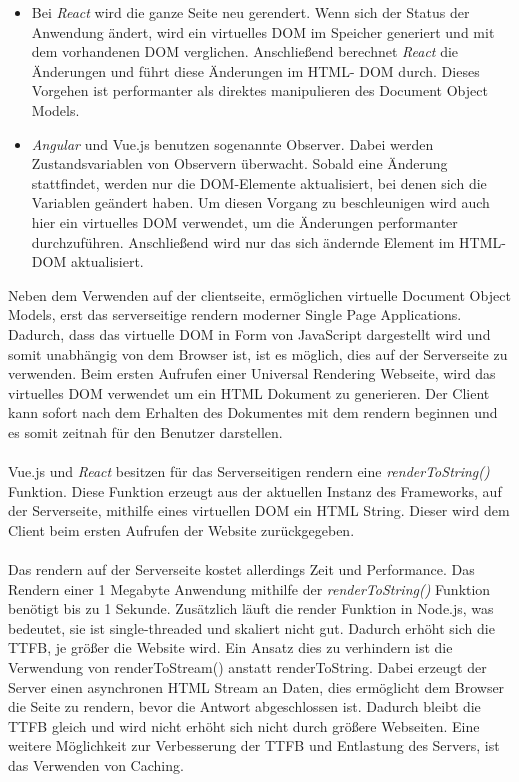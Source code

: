 \documentclass[runningheads]{llncs}
\numberwithin{figure}{section}
\begin{document}
\begin{itemize}
  \setlength\itemsep{1em}
  \item Bei \textit{React} wird die ganze Seite neu gerendert. 
  Wenn sich der Status der Anwendung ändert, 
  wird ein virtuelles DOM im Speicher generiert 
  und mit dem vorhandenen DOM verglichen. 
  Anschließend berechnet \textit{React} die Änderungen und führt diese 
  Änderungen im HTML- DOM durch. 
  Dieses Vorgehen ist performanter als direktes manipulieren 
  des Document Object Models.

  \item \textit{Angular} und Vue.js benutzen sogenannte Observer. 
  Dabei werden  Zustandsvariablen von Observern überwacht. 
  Sobald eine Änderung stattfindet, 
  werden nur die DOM-Elemente aktualisiert, 
  bei denen sich die Variablen geändert haben. 
  Um diesen Vorgang zu beschleunigen 
  wird auch hier ein virtuelles DOM verwendet, 
  um die Änderungen performanter durchzuführen. 
  Anschließend wird nur das sich ändernde Element im HTML- DOM aktualisiert.
\end{itemize}
Neben dem Verwenden auf der clientseite, 
ermöglichen virtuelle Document Object Models, 
erst das serverseitige rendern moderner Single Page Applications. 
Dadurch, dass das virtuelle DOM in Form von JavaScript dargestellt wird und 
somit unabhängig von dem Browser ist, 
ist es möglich, dies auf der Serverseite zu verwenden. 
Beim ersten Aufrufen einer Universal Rendering Webseite, 
wird das virtuelles DOM verwendet um ein HTML Dokument zu generieren. 
Der Client kann sofort nach dem Erhalten des Dokumentes mit dem rendern beginnen und 
es somit zeitnah für den Benutzer darstellen. \cite{krajka_2015}
\\
\\
Vue.js und \textit{React} besitzen für das Serverseitigen rendern eine \textit{renderToString()} Funktion. 
Diese Funktion erzeugt aus der aktuellen Instanz des Frameworks, 
auf der Serverseite, 
mithilfe eines virtuellen DOM ein HTML String. 
Dieser wird dem Client beim ersten Aufrufen der Website zurückgegeben.
\\
\\
Das rendern auf der Serverseite kostet allerdings Zeit und Performance. 
Das Rendern einer 1 Megabyte Anwendung mithilfe der \textit{renderToString() }
Funktion benötigt bis zu 1 Sekunde. 
Zusätzlich läuft die render Funktion in Node.js, 
was bedeutet, sie ist single-threaded und skaliert nicht gut. 
Dadurch erhöht sich die TTFB, je größer die Website wird. 
Ein Ansatz dies zu verhindern ist die Verwendung von renderToStream() anstatt renderToString. 
Dabei erzeugt der Server einen asynchronen HTML Stream an Daten, 
dies ermöglicht dem Browser die Seite zu rendern, 
bevor die Antwort abgeschlossen ist. 
Dadurch bleibt die TTFB gleich und 
wird nicht erhöht sich nicht durch größere Webseiten. 
Eine weitere Möglichkeit zur Verbesserung der TTFB und Entlastung des Servers, 
ist das Verwenden von Caching.
\end{document}
